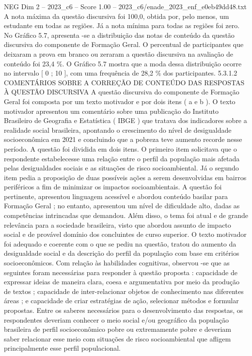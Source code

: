 \begin{textsample}{NEG Dim 2 – 2023\_c6 – Score 1.00 – 2023\_c6/enade\_2023\_enf\_e0eb49dd48.txt}
A nota máxima da questão discursiva foi 100,0, obtida por, pelo menos, um estudante em todas as regiões.
Já a nota mínima para todas as regiões foi zero.
No Gráfico 5.7, apresenta -se a distribuição das notas de conteúdo da questão discursiva do componente de Formação Geral.
O percentual de participantes que deixaram a prova em branco ou zeraram a questão discursiva na avaliação de conteúdo foi 23,4 \%.
O Gráfico 5.7 mostra que a moda dessa distribuição ocorre no intervalo [ 0 ; 10 ], com uma frequência de 28,2 \% dos participantes. 5.3.1.2 COMENTÁRIOS SOBRE A CORREÇÃO DE CONTEÚDO DAS RESPOSTAS À QUESTÃO DISCURSIVA A questão discursiva do componente de Formação Geral foi composta por um texto motivador e por dois itens ( a e b ).
O texto motivador apresentou um comentário sobre uma publicação do Instituto Brasileiro de Geografia e Estatística ( IBGE ) que tratava dos indicadores sobre a realidade social brasileira, apontando o crescimento do nível de desigualdade socioeconômica em 2021 e concluindo que a pobreza teve aumento recorde nesse período.
A questão foi dividida em dois itens.
O primeiro item solicitava que o respondente estabelecesse uma relação entre o perfil da população mais afetada pelas desigualdades sociais e as situações de risco socioambiental.
Já o segundo item pedia a proposição de duas possíveis ações a serem desenvolvidas em bairros periféricos a fim de minimizar os impactos socioambientais.
A questão foi pertinente, apresentou linguagem acessível e abordou conteúdo basilar para Formação Geral ; no entanto, apresentou um nível de dificuldade alto, dadas as competências intrincadas que demandou.
Além disso, o tema foi atual e de grande relevância para a sociedade brasileira, visto que abordou assunto de impacto social e de provável domínio dos concluintes de curso superior.
O texto motivador foi adequado e coerente com o que se pediu na questão, tratou do aumento da desigualdade social e da descrição do perfil da população com base em critérios socioeconômicos.
Com relação às habilidades cognitivas, observou -se que as seguintes foram necessárias para responder à questão proposta : capacidade de expressar ideias de maneira clara, coesa e argumentativa por meio da produção de textos ; capacidade de inter-relacionar objetos de conhecimento nas diferentes áreas ; e capacidade de criar estratégias de ação, selecionar métodos e formular propostas.
Entre os saberes necessários para o desenvolvimento das respostas, os respondentes deveriam conhecer o meio social e/ou geográfico da população brasileira de perfil socioeconômico pobre ou extremamente pobre e deveriam saber relacionar esse meio com situações de risco socioambiental que afligem principalmente esse perfil populacional.

\end{textsample}
